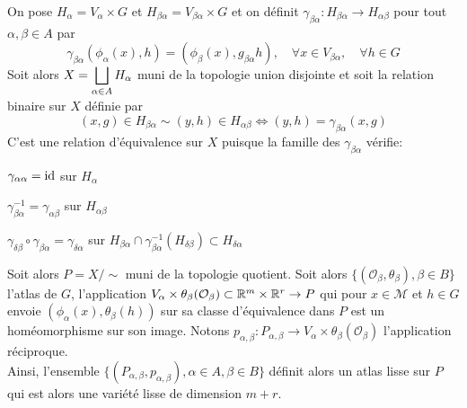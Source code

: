 \documentclass[12pt, a4paper]{book}
\begin{document}
On pose $H_\alpha = V_\alpha\times G$ et $H_{\beta\alpha} = V_{\beta\alpha}\times G$ et on définit $\gamma_{\beta\alpha} : H_{\beta\alpha} \to H_{\alpha\beta}$ pour tout $\alpha, \beta \in A$ par
$$\gamma_{\beta\alpha}(\phi_\alpha(x), h) = (\phi_\beta(x), g_{\beta\alpha}h), \quad \forall x\in V_{\beta\alpha}, \quad \forall h\in G$$
Soit alors $X = \displaystyle \bigsqcup_{\alpha \in A} H_\alpha$ muni de la topologie union disjointe et soit la relation binaire sur $X$ définie par
$$(x, g) \in H_{\beta\alpha} \sim (y, h) \in H_{\alpha\beta} \iff (y,h) = \gamma_{\beta\alpha}(x,g)$$
C'est une relation d'équivalence sur $X$ puisque la famille des $\gamma_{\beta\alpha}$ vérifie:
\be
	\item $\gamma_{\alpha\alpha} = \operatorname{id}$ sur $H_\alpha$
	\item $\gamma_{\beta\alpha}^{-1} = \gamma_{\alpha\beta}$ sur $H_{\alpha\beta}$
	\item $\gamma_{\delta\beta} \circ \gamma_{\beta\alpha} = \gamma_{\delta\alpha}$ sur $H_{\beta\alpha} \cap \gamma_{\beta\alpha}^{-1}(H_{\delta\beta}) \subset H_{\delta\alpha}$ \\
\ee

Soit alors $P = X/\sim$ muni de la topologie quotient. Soit alors $\{(\mathcal{O}_\beta, \theta_\beta), \beta \in B\}$ l'atlas de $G$, l'application $V_\alpha \times \theta_\beta(\mathcal{O}_\beta) \subset \mathbb{R}^m \times \mathbb{R}^r \to P$ qui pour $x\in \mathcal{M}$ et $h\in G$ envoie $(\phi_\alpha(x), \theta_\beta(h))$ sur sa classe d'équivalence dans $P$ est un homéomorphisme sur son image. Notons $p_{\alpha, \beta} : P_{\alpha, \beta} \to V_\alpha \times \theta_\beta(\mathcal{O}_\beta)$ l'application réciproque. \\

Ainsi, l'ensemble $\{(P_{\alpha, \beta}, p_{\alpha, \beta}), \alpha\in A, \beta\in B\}$ définit alors un atlas lisse sur $P$ qui est alors une variété lisse de dimension $m+r$. \\
\end{document}
